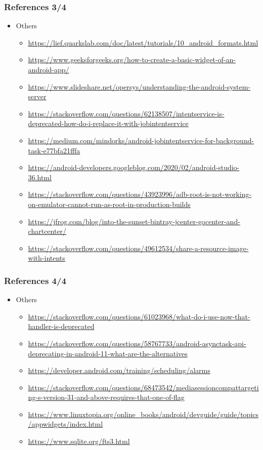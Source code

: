 \documentclass[10pt,xcolor=pdflatex]{beamer}
\begin{document}
\begin{frame}[fragile]\frametitle{References 3/4}
\begin{itemize}
    \item Others
      \begin{itemize}
        \footnotesize
        \item \url{https://lief.quarkslab.com/doc/latest/tutorials/10_android_formats.html}
        \item \url{https://www.geeksforgeeks.org/how-to-create-a-basic-widget-of-an-android-app/}
        \item \url{https://www.slideshare.net/opersys/understanding-the-android-system-server}
        \item{\url{https://stackoverflow.com/questions/62138507/intentservice-is-deprecated-how-do-i-replace-it-with-jobintentservice}}
        \item{\url{https://medium.com/mindorks/android-jobintentservice-for-background-task-e77bfa21fffa}}
        \item \url{https://android-developers.googleblog.com/2020/02/android-studio-36.html}
        \item \url{https://stackoverflow.com/questions/43923996/adb-root-is-not-working-on-emulator-cannot-run-as-root-in-production-builds}
        \item \url{https://jfrog.com/blog/into-the-sunset-bintray-jcenter-gocenter-and-chartcenter/}
        \item \url{https://stackoverflow.com/questions/49612534/share-a-resource-image-with-intents}
        \normalsize
      \end{itemize}
\end{itemize}
\end{frame}

\begin{frame}[fragile]\frametitle{References 4/4}
\begin{itemize}
    \item Others
      \begin{itemize}
        \footnotesize
        \item \url{https://stackoverflow.com/questions/61023968/what-do-i-use-now-that-handler-is-deprecated}
        \item \url{https://stackoverflow.com/questions/58767733/android-asynctask-api-deprecating-in-android-11-what-are-the-alternatives}
        \item \url{https://developer.android.com/training/scheduling/alarms}
        \item \url{https://stackoverflow.com/questions/68473542/mediasessioncompattargeting-s-version-31-and-above-requires-that-one-of-flag}
        \item \url{https://www.linuxtopia.org/online_books/android/devguide/guide/topics/appwidgets/index.html}
        \item \url{https://www.sqlite.org/fts3.html}
        \normalsize
      \end{itemize}
\end{itemize}
\end{frame}


\end{document}
